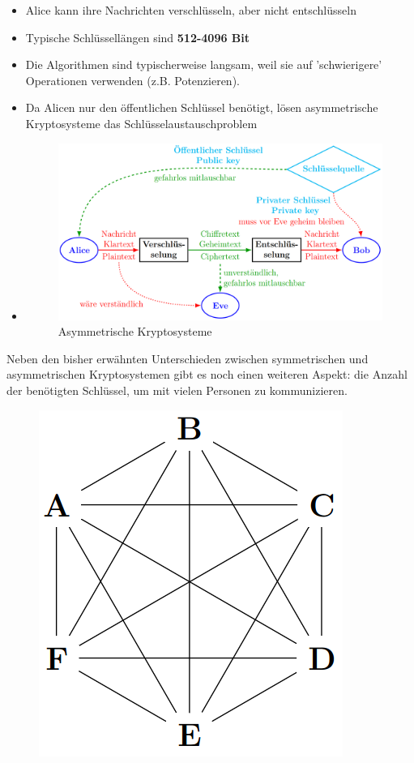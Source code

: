 \begin{enumerate}
\begin{itemize}
		\item Alice kann ihre Nachrichten verschlüsseln, aber nicht entschlüsseln
		\item Typische Schlüssellängen sind \textbf{512-4096 Bit}
		\item Die Algorithmen sind typischerweise langsam, weil sie auf 'schwierigere' Operationen verwenden (z.B. Potenzieren).
		\item Da Alicen nur den öffentlichen Schlüssel benötigt, lösen asymmetrische Kryptosysteme das Schlüsselaustauschproblem 
		\item[] 
		\begin{figure}[H]
			\centering
			\includegraphics[width=1.0\linewidth]{figures/asymmkry.png}
			\caption{Asymmetrische Kryptosysteme}
		\end{figure}
	\end{itemize}
\end{enumerate}

Neben den bisher erwähnten Unterschieden zwischen symmetrischen und asymmetrischen Kryptosystemen gibt es noch einen weiteren Aspekt: die Anzahl der benötigten Schlüssel, um mit vielen Personen zu kommunizieren.
\begin{figure}[H]
	\centering
	\includegraphics[width=0.2\linewidth]{figures/hexagon.png}
\end{figure}


